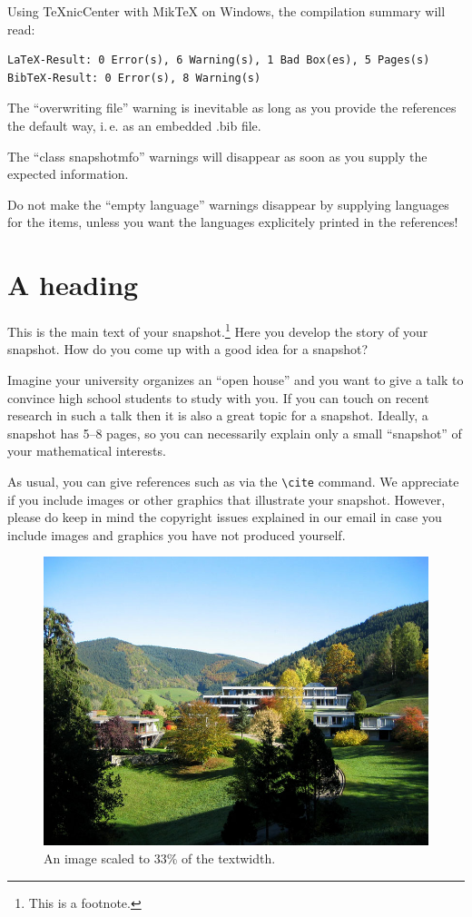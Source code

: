 \documentclass{snapshotmfo}
\begin{document}
Using TeXnicCenter with MikTeX on Windows, the compilation summary will read:
\begin{verbatim}
LaTeX-Result: 0 Error(s), 6 Warning(s), 1 Bad Box(es), 5 Pages(s)
BibTeX-Result: 0 Error(s), 8 Warning(s)
\end{verbatim}

The ``overwriting file'' warning is inevitable as long as you provide the references the default
way, i.\,e. as an embedded .bib file.

The ``class snapshotmfo'' warnings will disappear as soon as you supply the expected information.

Do not make the ``empty language'' warnings disappear by supplying languages for the items,
unless you want the languages explicitely printed in the references!


\section{A heading}

This is the main text of your snapshot.\!\footnote{This is a footnote.} Here you develop the story of your snapshot.
How do you come up with a good idea for a snapshot?

Imagine your university organizes an ``open house'' and you want to give a talk to convince high school students to study with you. If you can touch on recent research in such a talk then it is also a great topic for a snapshot. Ideally, a snapshot has 5--8 pages, so you can necessarily explain only a small ``snapshot'' of your mathematical interests.

As usual, you can give references such as \cite{knuth1984texbook, wikiMath, sample13, sample12, sample11, sample14, helfgott14} via the \verb+\cite+ command.
We appreciate if you include images or other graphics that illustrate your snapshot. However, please do keep in mind the copyright issues explained in our email in case you include images and graphics you have not produced yourself.

\begin{figure}[ht]
        \centering
        \includegraphics[width= 0.33 \textwidth]{mfo.jpg}
        \caption{An image scaled to 33\% of the textwidth.}
\label{fig.sample-image}
\end{figure}
\end{document}
